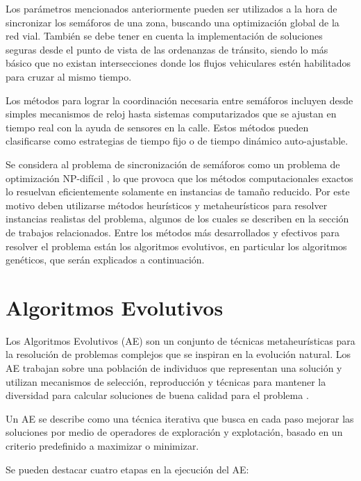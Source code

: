 Los parámetros mencionados anteriormente pueden ser utilizados a la hora de sincronizar los semáforos de una zona, buscando una optimización global de la red vial. También se debe tener en cuenta la implementación de soluciones seguras desde el punto de vista de las ordenanzas de tránsito, siendo lo más básico que no existan intersecciones donde los flujos vehiculares estén habilitados para cruzar al mismo tiempo.

Los métodos para lograr la coordinación necesaria entre semáforos incluyen desde simples mecanismos de reloj hasta sistemas computarizados que se ajustan en tiempo real con la ayuda de sensores en la calle. Estos métodos pueden clasificarse como estrategias de tiempo fijo o de tiempo dinámico auto-ajustable.

Se considera al problema de sincronización de semáforos como un problema de optimización NP-difícil \citep{yang1996model}, lo que provoca que los métodos computacionales exactos lo resuelvan eficientemente solamente en instancias de tamaño reducido. Por este motivo deben utilizarse métodos heurísticos y metaheurísticos para resolver instancias realistas del problema, algunos de los cuales se describen en la sección de trabajos relacionados. Entre los métodos más desarrollados y efectivos para resolver el problema están los algoritmos evolutivos, en particular los algoritmos genéticos, que serán explicados a continuación.

\section{Algoritmos Evolutivos}

Los Algoritmos Evolutivos (AE) son un conjunto de técnicas metaheurísticas para la resolución de problemas complejos que se inspiran en la evolución natural. Los AE trabajan sobre una población de individuos que representan una solución y utilizan mecanismos de selección, reproducción y técnicas para mantener la diversidad para calcular soluciones de buena calidad para el problema \citep{spears2000evolutionary}. 

Un AE se describe como una técnica iterativa que busca en cada paso mejorar las soluciones por medio de operadores de exploración y explotación, basado en un criterio predefinido a maximizar o minimizar.

Se pueden destacar cuatro etapas en la ejecución del AE:

